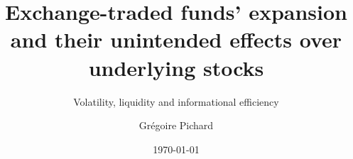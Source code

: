 \documentclass[a4paper, twoside, 10pt, titlepage, captions = tableheading]{scrartcl}
\title{Exchange-traded funds' expansion and their unintended effects over underlying stocks}
\subtitle{Volatility, liquidity and informational efficiency}
\date{\today}
\author{Grégoire Pichard}
\begin{document}
\maketitle
\renewcommand{\sectionautorefname}{Section}
\tableofcontents
\listoftables
\listoffigures
\clearpage







\clearpage
\printbibliography
\clearpage
\appendix



\end{document}
